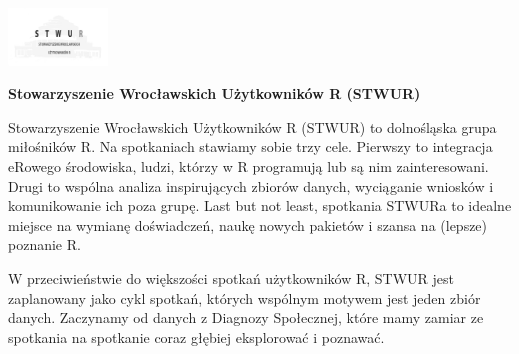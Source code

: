 \documentclass[\main/boa.tex]{subfiles}
\begin{document}
	
	\begin{minipage}[t]{0.915\textwidth}
		\center     
		\includegraphics[width=100px]{img/logos.bw/stwur.png} 
	\end{minipage}
	
	\Large \textbf {Stowarzyszenie Wrocławskich Użytkowników R (STWUR)}
	
	
	\vskip 0.3cm
	\normalsize 
	Stowarzyszenie Wrocławskich Użytkowników R (STWUR) to dolnośląska grupa miłośników R. Na spotkaniach stawiamy sobie trzy cele. Pierwszy to integracja eRowego środowiska, ludzi, którzy w R programują lub są nim zainteresowani. Drugi to wspólna analiza inspirujących zbiorów danych, wyciąganie wniosków i komunikowanie ich poza grupę. Last but not least, spotkania STWURa to idealne miejsce na wymianę doświadczeń, naukę nowych pakietów i szansa na (lepsze) poznanie R.
	
	W przeciwieństwie do większości spotkań użytkowników R, STWUR jest zaplanowany jako cykl spotkań, których wspólnym motywem jest jeden zbiór danych. Zaczynamy od danych z Diagnozy Społecznej, które mamy zamiar ze spotkania na spotkanie coraz głębiej eksplorować i poznawać.
	
	\vskip 1.5cm
\end{document}
